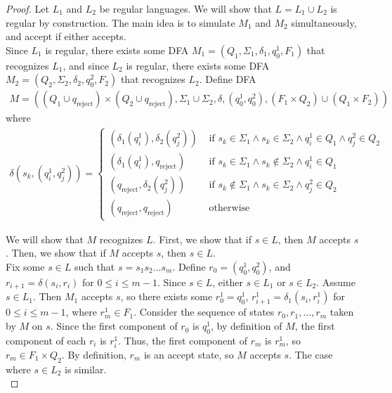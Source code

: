 \documentclass{article}
\begin{document}
\begin{proof}
    Let $L_1$ and $L_2$ be regular languages. We will show that $L = L_1 \cup L_2$ is regular by construction. The main idea is to simulate $M_1$ and $M_2$ 
    simultaneously, and accept if either accepts. \\
    
    \noindent
    Since $L_1$ is regular, there exists some DFA $M_1 = (Q_1, \Sigma_1, \delta_1, q_{0}^1, F_1)$ that recognizes $L_1$, and since $L_2$ is regular, there 
    exists some DFA $M_2 = (Q_2, \Sigma_2, \delta_2, q_{0}^2, F_2)$ that recognizes $L_2$. Define DFA 
    \begin{align*}
        M = ((Q_1 \cup q_{\text{reject}}) \times (Q_2 \cup q_{\text{reject}}), \Sigma_1 \cup \Sigma_2, \delta, (q_{0}^1, q_{0}^2), (F_1 \times Q_2) \cup (Q_1 \times F_2))
    \end{align*}
    where
    \begin{align*}
        \delta(s_k, (q_i^1, q_j^2)) = \begin{cases}
            (\delta_1(q_i^1), \delta_2(q_j^2)) & \text{ if } s_k \in \Sigma_1 \land s_k \in \Sigma_2 \land q_i^1 \in Q_1 \land q_j^2 \in Q_2 \\
            (\delta_1(q_i^1), q_{\text{reject}}) & \text{ if } s_k \in \Sigma_1 \land s_k \not \in \Sigma_2 \land q_i^1 \in Q_1 \\
            (q_{\text{reject}}, \delta_2(q_j^2)) & \text{ if } s_k \not \in \Sigma_1 \land s_k \in \Sigma_2 \land q_j^2 \in Q_2 \\
            (q_{\text{reject}}, q_{\text{reject}}) & \text{ otherwise}
        \end{cases}
    \end{align*}

    \noindent
    We will show that $M$ recognizes $L$. First, we show that if $s \in L$, then $M$ accepts $s$. Then, we show that if $M$ accepts $s$, then $s \in L$. \\ 
    
    \noindent
    Fix some $s \in L$ such that $s = s_1 s_2 \ldots s_m$. Define $r_0 = (q_0^1, q_0^2)$, and $r_{i+1} = \delta(s_i, r_i)$ for $0 \leq i \leq m - 1$. Since 
    $s \in L$, either $s \in L_1$ or $s \in L_2$. Assume $s \in L_1$. Then $M_1$ accepts $s$, so there exists some $r_0^1 = q_0^1$, 
    $r_{i+1}^1 = \delta_1(s_i, r_i^1)$ for $0 \leq i \leq m - 1$, where $r_m^1 \in F_1$. Consider the sequence of states $r_0, r_1, \ldots, r_m$ taken by $M$ on 
    $s$. Since the first component of $r_0$ is $q_0^1$, by definition of $M$, the first component of each $r_i$ is $r_i^1$. Thus, the first component of $r_m$ 
    is $r_m^1$, so $r_m \in F_1 \times Q_2$. By definition, $r_m$ is an accept state, so $M$ accepts $s$. The case where $s \in L_2$ is similar. \\


\end{proof}
\end{document}
